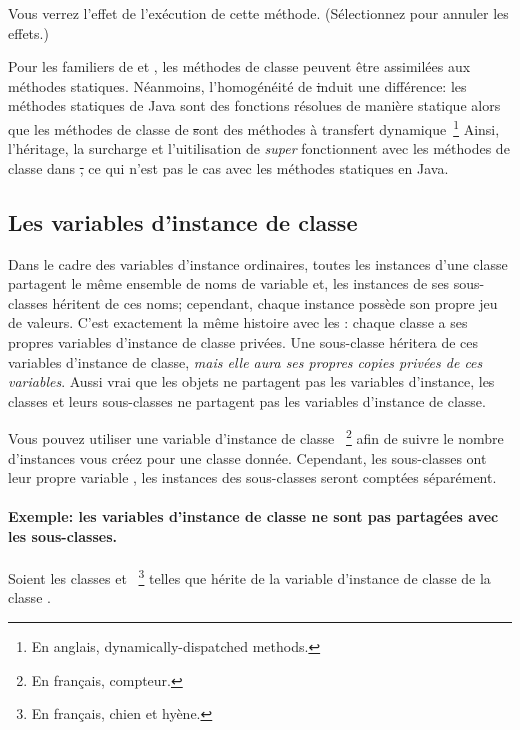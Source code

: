 \documentclass[a4paper,10pt,twoside]{book}
\begin{document}
Vous verrez l'effet de l'ex\'ecution de cette m\'ethode.  (S\'electionnez  pour annuler les effets.)

Pour les familiers de  et ,  les m\'ethodes de classe peuvent \^etre assimil\'ees aux m\'ethodes statiques. 
N\'eanmoins, l'homog\'en\'eit\'e de \st induit une diff\'erence:  les m\'ethodes statiques de Java sont des fonctions r\'esolues de mani\`ere statique alors que les m\'ethodes de classe de \st sont des m\'ethodes \`a transfert dynamique~\footnote{En anglais, dynamically-dispatched methods.} Ainsi, l'h\'eritage, la surcharge et l'uitilisation de \emph{super} fonctionnent avec les m\'ethodes de classe dans \st, ce qui n'est pas le cas avec les m\'ethodes statiques en Java.  

\subsection{Les variables d'instance de classe}
Dans le cadre des variables d'instance ordinaires,
toutes les instances d'une classe partagent le m\^eme ensemble
de noms de variable et, les instances de ses sous-classes h\'eritent
de ces noms; cependant, chaque instance poss\`ede son propre jeu de valeurs.
C'est exactement la m\^eme histoire avec les : chaque classe a ses propres variables d'instance de classe priv\'ees.
Une sous-classe h\'eritera de ces  variables d'instance de classe, \emph{mais elle aura ses propres copies priv\'ees de ces variables}.
Aussi vrai que les objets ne partagent pas les variables d'instance, les classes et leurs sous-classes ne partagent pas les variables d'instance de classe.

Vous pouvez utiliser une variable d'instance de classe ~\footnote{En fran\c{c}ais, compteur.} afin de suivre le nombre d'instances vous cr\'eez pour une classe donn\'ee.
Cependant, les sous-classes ont leur propre variable , 
les instances des sous-classes seront compt\'ees s\'epar\'ement.

\paragraph{Exemple: les variables d'instance de classe ne sont pas partag\'ees avec les sous-classes.}
Soient les classes  et ~\footnote{En fran\c{c}ais, chien et hy\`ene.} telles que  h\'erite de la variable d'instance de classe  de la classe .
\end{document}
